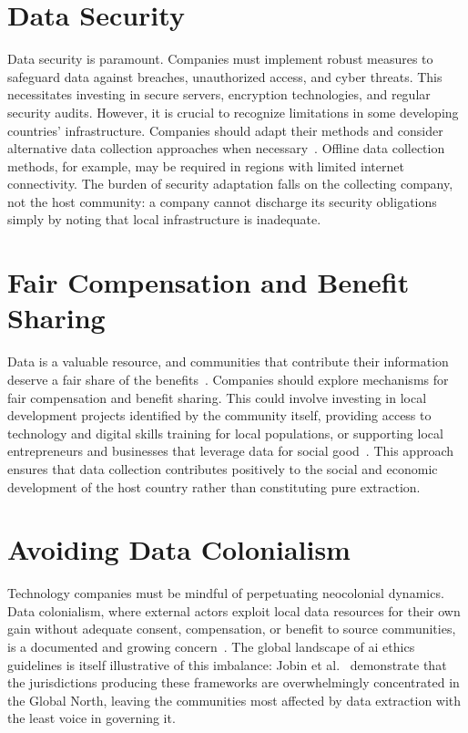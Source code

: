 \documentclass[11pt,showkeys]{essay}
\begin{document}
\section{Data Security}

Data security is paramount. Companies must implement robust measures to safeguard data against breaches, unauthorized access, and cyber threats. This necessitates investing in secure servers, encryption technologies, and regular security audits. However, it is crucial to recognize limitations in some developing countries' infrastructure. Companies should adapt their methods and consider alternative data collection approaches when necessary~\cite{runde_innovative_2022}. Offline data collection methods, for example, may be required in regions with limited internet connectivity. The burden of security adaptation falls on the collecting company, not the host community: a company cannot discharge its security obligations simply by noting that local infrastructure is inadequate.

\section{Fair Compensation and Benefit Sharing}

Data is a valuable resource, and communities that contribute their information deserve a fair share of the benefits~\cite{runde_innovative_2022}. Companies should explore mechanisms for fair compensation and benefit sharing. This could involve investing in local development projects identified by the community itself, providing access to technology and digital skills training for local populations, or supporting local entrepreneurs and businesses that leverage data for social good~\cite{hanna_how_2017}. This approach ensures that data collection contributes positively to the social and economic development of the host country rather than constituting pure extraction.

\section{Avoiding Data Colonialism}

Technology companies must be mindful of perpetuating neocolonial dynamics. Data colonialism, where external actors exploit local data resources for their own gain without adequate consent, compensation, or benefit to source communities, is a documented and growing concern~\cite{edwards_slave_2017}. The global landscape of \gls{ai} ethics guidelines is itself illustrative of this imbalance: Jobin et al.~\cite{jobin_global_2019} demonstrate that the jurisdictions producing these frameworks are overwhelmingly concentrated in the Global North, leaving the communities most affected by data extraction with the least voice in governing it.
\end{document}

